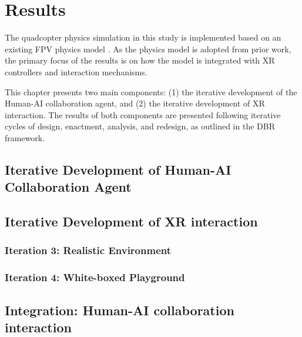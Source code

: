 
\newpage
\section{Results}

The quadcopter physics simulation in this study is implemented based on an existing FPV physics model \parencite{yuetility2022fpvphysics}. As the physics model is adopted from prior work, the primary focus of the results is on how the model is integrated with XR controllers and interaction mechanisms.

This chapter presents two main components: (1) the iterative development of the Human-AI collaboration agent, and (2) the iterative development of XR interaction. The results of both components are presented following iterative cycles of design, enactment, analysis, and redesign, as outlined in the DBR framework.

\subsection{Iterative Development of Human-AI Collaboration Agent}





\subsection{Iterative Development of XR interaction}





\subsubsection{Iteration 3: Realistic Environment}

\subsubsection{Iteration 4: White-boxed Playground}

\subsection{Integration: Human-AI collaboration interaction}

